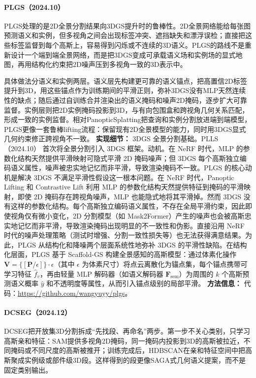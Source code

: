 \paragraph{PLGS（2024.10）\cite{2410_17505}}
PLGS处理的是2D全景分割结果向3DGS提升时的鲁棒性。2D全景网络能给每张图预测语义和实例，但多视角之间会出现标签冲突、遮挡缺失和漂浮误检；直接把这些标签监督到每个高斯上，容易得到闪烁或不连续的3D语义。PLGS的路线不是重新设计一个端到端全景网络，而是把3DGS变成可承载语义场和实例场的显式地图，再用结构化约束把2D噪声压到多视角一致的3D表示中。

具体做法分语义和实例两层。语义层先构建更可靠的语义锚点，把高置信2D标签提升到3D，用这些锚点作为训练期间的平滑正则，弥补3DGS没有MLP天然连续性的缺点；随后通过自训练合并渲染出的语义掩码和噪声2D掩码，逐步扩大可靠监督。实例层则把2D实例掩码投影到3D，与有向包围盒和跨视角几何关系匹配，形成一致的实例监督。相对PanopticSplatting把查询和实例分割放进端到端模型，PLGS更像一套鲁棒lifting流程：保留现有2D全景模型的能力，同时用3DGS显式几何约束修正跨视角不一致。
\textbf{实现细节：} 3DGS 全景分割基础。PLLS（2024.10） 首次将全景分割引入 3DGS 框架。动机。在 NeRF 时代，MLP 的参数化结构天然提供平滑映射可隐式平滑 2D 掩码噪声；但 3DGS 每个高斯独立编码语义属性，噪声被忠实地记忆而非平滑，导致渲染掩码不一致。PLGS 的核心动机是解决 3DGS 不满足平滑性假设这一根本问题。在 NeRF 时代，Panoptic Lifting 和 Contrastive Lift 利用 MLP 的参数化结构天然提供特征到掩码的平滑映射，即使 2D 掩码存在跨视角噪声，MLP 也能隐式地将其平滑掉。然而 3DGS 没有这样的参数化结构。每个高斯独立编码语义属性，不存在全局平滑约束，因此即使视角仅有微小变化，2D 分割模型（如 Mask2Former）产生的噪声也会被高斯忠实地记忆而非平滑，导致渲染掩码出现明显的不一致性和伪影。直接沿用 NeRF 时代的噪声处理策略（测试时增强、分割一致性损失等）也无法获得满意结果。为此，PLGS 从结构化和降噪两个层面系统性地弥补 3DGS 的平滑性缺陷。在结构化层面，PLGS 基于 Scaffold-GS 构建全景感知的高斯模型：通过体素化操作 $\mathbf{V} = \{[\mathbf{P}/\epsilon]\} \cdot \epsilon$（其中 $\epsilon$ 为体素尺寸）将点云离散化为锚点集，每个锚点携带可学习特征 $\hat{f}_v$，再由轻量 MLP 解码器（如语义解码器 $\mathbf{F}_{\mathrm{sem}}$）为周围的 $k$ 个高斯预测语义概率 $\hat{y}$ 和不透明度等属性，从而引入锚点级别的局部平滑。
\textbf{方法信息：} 代码：\url{https://github.com/wangyuyy/plgs}。



\paragraph{DCSEG（2024.12）\cite{2412_10972}}
DCSEG把开放集3D分割拆成“先找段、再命名”两步。第一步不关心类别，只学习高斯亲和特征：SAM提供多视角2D掩码，同一掩码内投影到3D的高斯被拉近，不同掩码或不同尺度的高斯被推开；训练完成后，HDBSCAN在亲和特征空间中把高斯聚成实例级或部件级3D段。这样得到的段更像SAGA式几何语义提案，而不是固定类别输出。

